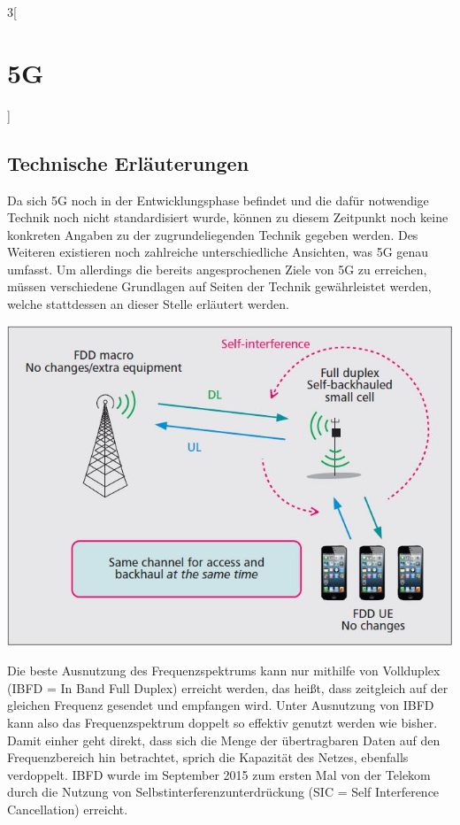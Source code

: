 \begin{multicols}{3}[\section{5G}]
\subsection*{Technische Erläuterungen}
Da sich 5G noch in der Entwicklungsphase befindet und die dafür notwendige Technik noch nicht standardisiert wurde, können zu diesem Zeitpunkt noch keine konkreten Angaben zu der zugrundeliegenden Technik gegeben werden. Des Weiteren existieren noch zahlreiche unterschiedliche Ansichten, was 5G genau umfasst. 
Um allerdings die bereits angesprochenen Ziele von 5G zu erreichen, müssen verschiedene Grundlagen auf Seiten der Technik gewährleistet werden, welche stattdessen an dieser Stelle erläutert werden.
\begin{Figure}
\includegraphics[width=\linewidth]{Kapitel/5G/Grafiken/sic}
\label{fig:5g.sic}
\end{Figure}

Die beste Ausnutzung des Frequenzspektrums kann nur mithilfe von Vollduplex (IBFD = In Band Full Duplex) erreicht werden, das heißt, dass zeitgleich auf der gleichen Frequenz gesendet und empfangen wird.
Unter Ausnutzung von IBFD kann also das Frequenzspektrum doppelt so effektiv genutzt werden wie bisher. Damit einher geht direkt, dass sich die Menge der übertragbaren Daten auf den Frequenzbereich hin betrachtet, sprich die Kapazität des Netzes, ebenfalls verdoppelt.
IBFD wurde im September 2015 zum ersten Mal von der Telekom durch die Nutzung von Selbstinterferenzunterdrückung (SIC = Self Interference Cancellation) erreicht.


\end{multicols}
